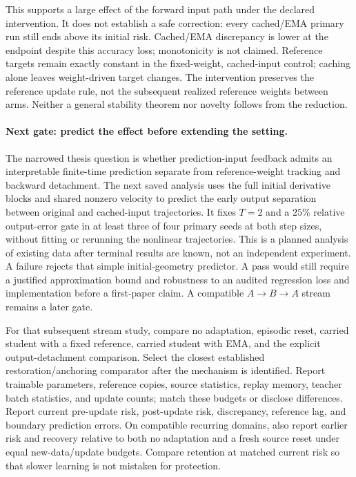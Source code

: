 \documentclass[11pt,a4paper]{article}
\begin{document}
This supports a large effect of the forward input path under the declared
intervention. It does not establish a safe correction: every cached/EMA
primary run still ends above its initial risk. Cached/EMA discrepancy is
lower at the endpoint despite this accuracy loss; monotonicity is not
claimed. Reference targets remain exactly constant in the fixed-weight,
cached-input control; caching alone leaves weight-driven target changes.
The intervention preserves the reference update rule, not the subsequent
realized reference weights between arms. Neither a general stability
theorem nor novelty follows from the reduction.

\paragraph{Next gate: predict the effect before extending the setting.}
The narrowed thesis question is whether prediction-input feedback admits
an interpretable finite-time prediction separate from reference-weight
tracking and backward detachment. The next saved analysis uses the full
initial derivative blocks and shared nonzero velocity to predict the
early output separation between original and cached-input trajectories.
It fixes $T=2$ and a $25\%$ relative output-error gate in at least three
of four primary seeds at both step sizes, without fitting or rerunning
the nonlinear trajectories. This is a planned analysis of existing data
after terminal results are known, not an independent experiment. A failure
rejects that simple initial-geometry predictor. A pass would still require
a justified approximation bound and robustness to an audited regression
loss and implementation before a first-paper claim. A compatible
$A\to B\to A$ stream remains a later gate.

For that subsequent stream study, compare no adaptation, episodic reset,
carried student with a fixed
reference, carried student with EMA, and the explicit output-detachment
comparison. Select the closest established restoration/anchoring comparator
after the mechanism is identified. Report trainable parameters, reference
copies, source statistics, replay memory, teacher batch statistics, and
update counts; match these budgets or disclose differences. Report current
pre-update risk, post-update risk, discrepancy, reference lag, and boundary
prediction errors. On compatible recurring domains, also report earlier
risk and recovery relative to both no adaptation and a fresh source reset
under equal new-data/update budgets. Compare retention at matched current
risk so that slower learning is not mistaken for protection.
\end{document}
